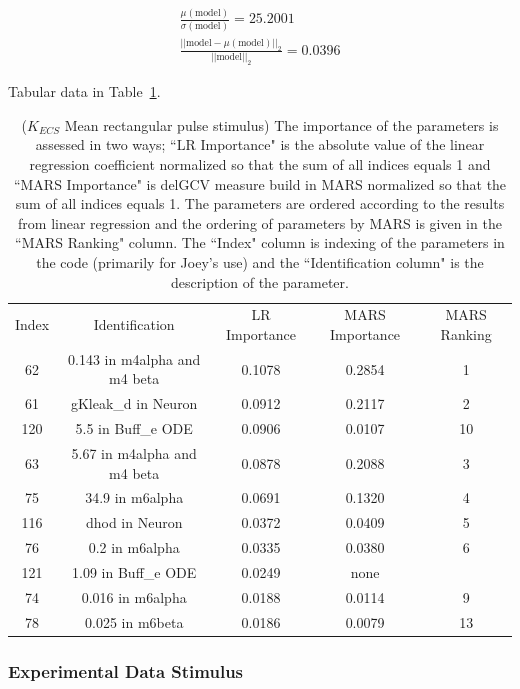 \documentclass[12pt]{article}
\numberwithin{equation}{section}
\begin{document}
\begin{eqnarray*}
\frac{\mu(\text{model})}{\sigma(\text{model})} = 25.2001\\
\frac{\vert \vert \text{model}-\mu(\text{model}) \vert \vert_2 }{\vert \vert \text{model}\vert \vert_2 } = 0.0396
\end{eqnarray*}

Tabular data in Table~\ref{qoi_K_ECS_Mean_rec}.

\begin{table}[h]
\centering
\begin{tabular}{ccccc}
Index & Identification & LR Importance & MARS Importance & MARS Ranking \\
62 & 0.143 in m4alpha and m4 beta &  0.1078 & 0.2854 & 1\\
61 & gKleak\_d in Neuron & 0.0912 & 0.2117 & 2\\
120 & 5.5 in Buff\_e ODE & 0.0906 & 0.0107 & 10\\
63 &   5.67 in m4alpha and m4 beta & 0.0878 & 0.2088 & 3\\
75 & 34.9 in m6alpha & 0.0691 & 0.1320 & 4\\
116 & dhod in Neuron & 0.0372 & 0.0409 & 5\\
76 & 0.2 in m6alpha & 0.0335 & 0.0380 & 6\\
121 & 1.09 in Buff\_e ODE & 0.0249 & none & \\
74 & 0.016 in m6alpha & 0.0188 & 0.0114 & 9\\
78 & 0.025 in m6beta & 0.0186 & 0.0079 & 13\\
\end{tabular}
\caption{($K_{ECS}$ Mean rectangular pulse stimulus) The importance of the parameters is assessed in two ways; ``LR Importance" is the absolute value of the linear regression coefficient normalized so that the sum of all indices equals 1 and ``MARS Importance" is delGCV measure build in MARS normalized so that the sum of all indices equals 1. The parameters are ordered according to the results from linear regression and the ordering of parameters by MARS is given in the ``MARS Ranking" column. The ``Index" column is indexing of the parameters in the code (primarily for Joey's use) and the ``Identification column" is the description of the parameter.}
\label{qoi_K_ECS_Mean_rec}
\end{table}

\newpage

\subsubsection{Experimental Data Stimulus}
\end{document}
